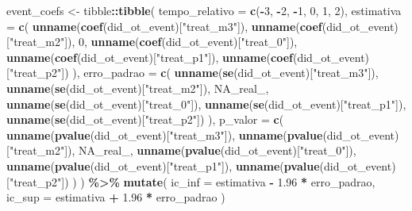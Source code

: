 \documentclass[
]{article}
\newenvironment{Shaded}{\begin{snugshade}}{\end{snugshade}}
\newcommand{\AttributeTok}[1]{\textcolor[rgb]{0.13,0.29,0.53}{#1}}
\newcommand{\ConstantTok}[1]{\textcolor[rgb]{0.56,0.35,0.01}{#1}}
\newcommand{\DecValTok}[1]{\textcolor[rgb]{0.00,0.00,0.81}{#1}}
\newcommand{\FloatTok}[1]{\textcolor[rgb]{0.00,0.00,0.81}{#1}}
\newcommand{\FunctionTok}[1]{\textcolor[rgb]{0.13,0.29,0.53}{\textbf{#1}}}
\newcommand{\NormalTok}[1]{#1}
\newcommand{\OtherTok}[1]{\textcolor[rgb]{0.56,0.35,0.01}{#1}}
\newcommand{\SpecialCharTok}[1]{\textcolor[rgb]{0.81,0.36,0.00}{\textbf{#1}}}
\newcommand{\StringTok}[1]{\textcolor[rgb]{0.31,0.60,0.02}{#1}}
\begin{document}
\begin{Shaded}
\begin{Highlighting}[]
\NormalTok{event\_coefs }\OtherTok{\textless{}{-}}\NormalTok{ tibble}\SpecialCharTok{::}\FunctionTok{tibble}\NormalTok{(}
  \AttributeTok{tempo\_relativo =} \FunctionTok{c}\NormalTok{(}\SpecialCharTok{{-}}\DecValTok{3}\NormalTok{, }\SpecialCharTok{{-}}\DecValTok{2}\NormalTok{, }\SpecialCharTok{{-}}\DecValTok{1}\NormalTok{, }\DecValTok{0}\NormalTok{, }\DecValTok{1}\NormalTok{, }\DecValTok{2}\NormalTok{),}
  \AttributeTok{estimativa =} \FunctionTok{c}\NormalTok{(}
    \FunctionTok{unname}\NormalTok{(}\FunctionTok{coef}\NormalTok{(did\_ot\_event)[}\StringTok{"treat\_m3"}\NormalTok{]),}
    \FunctionTok{unname}\NormalTok{(}\FunctionTok{coef}\NormalTok{(did\_ot\_event)[}\StringTok{"treat\_m2"}\NormalTok{]),}
    \DecValTok{0}\NormalTok{,}
    \FunctionTok{unname}\NormalTok{(}\FunctionTok{coef}\NormalTok{(did\_ot\_event)[}\StringTok{"treat\_0"}\NormalTok{]),}
    \FunctionTok{unname}\NormalTok{(}\FunctionTok{coef}\NormalTok{(did\_ot\_event)[}\StringTok{"treat\_p1"}\NormalTok{]),}
    \FunctionTok{unname}\NormalTok{(}\FunctionTok{coef}\NormalTok{(did\_ot\_event)[}\StringTok{"treat\_p2"}\NormalTok{])}
\NormalTok{  ),}
  \AttributeTok{erro\_padrao =} \FunctionTok{c}\NormalTok{(}
    \FunctionTok{unname}\NormalTok{(}\FunctionTok{se}\NormalTok{(did\_ot\_event)[}\StringTok{"treat\_m3"}\NormalTok{]),}
    \FunctionTok{unname}\NormalTok{(}\FunctionTok{se}\NormalTok{(did\_ot\_event)[}\StringTok{"treat\_m2"}\NormalTok{]),}
    \ConstantTok{NA\_real\_}\NormalTok{,}
    \FunctionTok{unname}\NormalTok{(}\FunctionTok{se}\NormalTok{(did\_ot\_event)[}\StringTok{"treat\_0"}\NormalTok{]),}
    \FunctionTok{unname}\NormalTok{(}\FunctionTok{se}\NormalTok{(did\_ot\_event)[}\StringTok{"treat\_p1"}\NormalTok{]),}
    \FunctionTok{unname}\NormalTok{(}\FunctionTok{se}\NormalTok{(did\_ot\_event)[}\StringTok{"treat\_p2"}\NormalTok{])}
\NormalTok{  ),}
  \AttributeTok{p\_valor =} \FunctionTok{c}\NormalTok{(}
    \FunctionTok{unname}\NormalTok{(}\FunctionTok{pvalue}\NormalTok{(did\_ot\_event)[}\StringTok{"treat\_m3"}\NormalTok{]),}
    \FunctionTok{unname}\NormalTok{(}\FunctionTok{pvalue}\NormalTok{(did\_ot\_event)[}\StringTok{"treat\_m2"}\NormalTok{]),}
    \ConstantTok{NA\_real\_}\NormalTok{,}
    \FunctionTok{unname}\NormalTok{(}\FunctionTok{pvalue}\NormalTok{(did\_ot\_event)[}\StringTok{"treat\_0"}\NormalTok{]),}
    \FunctionTok{unname}\NormalTok{(}\FunctionTok{pvalue}\NormalTok{(did\_ot\_event)[}\StringTok{"treat\_p1"}\NormalTok{]),}
    \FunctionTok{unname}\NormalTok{(}\FunctionTok{pvalue}\NormalTok{(did\_ot\_event)[}\StringTok{"treat\_p2"}\NormalTok{])}
\NormalTok{  )}
\NormalTok{) }\SpecialCharTok{\%\textgreater{}\%}
  \FunctionTok{mutate}\NormalTok{(}
    \AttributeTok{ic\_inf =}\NormalTok{ estimativa }\SpecialCharTok{{-}} \FloatTok{1.96} \SpecialCharTok{*}\NormalTok{ erro\_padrao,}
    \AttributeTok{ic\_sup =}\NormalTok{ estimativa }\SpecialCharTok{+} \FloatTok{1.96} \SpecialCharTok{*}\NormalTok{ erro\_padrao}
\NormalTok{  )}


\end{Highlighting}
\end{Shaded}
\end{document}
